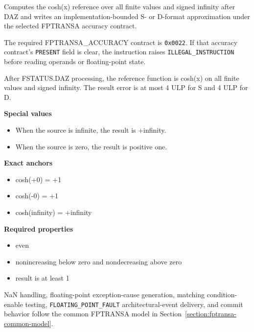 Computes the cosh(x) reference over all finite values and signed infinity after DAZ and writes an implementation-bounded S- or D-format approximation under the selected FPTRANSA accuracy contract.

The required FPTRANSA\_ACCURACY contract is \texttt{0x0022}. If that accuracy contract's \texttt{PRESENT} field is clear, the instruction raises \texttt{ILLEGAL\_INSTRUCTION} before reading operands or floating-point state.

After FSTATUS.DAZ processing, the reference function is cosh(x) on all finite values and signed infinity. The result error is at most 4 ULP for S and 4 ULP for D.

\textbf{Special values}\par
\begin{itemize}
\item When the source is infinite, the result is +infinity.
\item When the source is zero, the result is positive one.
\end{itemize}

\textbf{Exact anchors}\par
\begin{itemize}
\item cosh(+0) = +1
\item cosh(-0) = +1
\item cosh(infinity) = +infinity
\end{itemize}

\textbf{Required properties}\par
\begin{itemize}
\item even
\item nonincreasing below zero and nondecreasing above zero
\item result is at least 1
\end{itemize}

NaN handling, floating-point exception-cause generation, matching condition-enable testing, \texttt{FLOATING\_POINT\_FAULT} architectural-event delivery, and commit behavior follow the common FPTRANSA model in Section~\ref{section:fptransa-common-model}.
